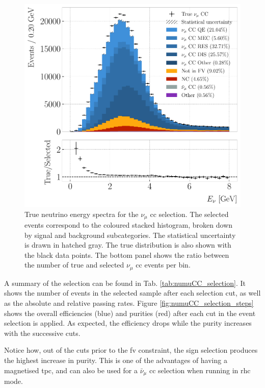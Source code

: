 \begin{figure}[t]
	\centering
	\includegraphics[width=.80\linewidth]{Images/GAr_selection/numuCC_selection_true_energy.pdf}
	\caption[True neutrino energy spectra for the $\nu_{\mu}$ \gls{cc} selection.]{True neutrino energy spectra for the $\nu_{\mu}$ \gls{cc} selection. The selected events correspond to the coloured stacked histogram, broken down by signal and background subcategories. The statistical uncertainty is drawn in hatched gray. The true distribution is also shown with the black data points. The bottom panel shows the ratio between the number of true and selected $\nu_{\mu}$ \gls{cc} events per bin.}
	\label{fig:numuCC_selection_true_enu}
\end{figure}

A summary of the selection can be found in Tab. \ref{tab:numuCC_selection}. It shows the number of events in the selected sample after each selection cut, as well as the absolute and relative passing rates. Figure \ref{fig:numuCC_selection_steps} shows the overall efficiencies (blue) and purities (red) after each cut in the event selection is applied. As expected, the efficiency drops while the purity increases with the successive cuts.

Notice how, out of the cuts prior to the \gls{fv} constraint, the sign selection produces the highest increase in purity. This is one of the advantages of having a magnetised \gls{tpc}, and can also be used for a $\bar{\nu}_{\mu}$ \gls{cc} selection when running in \gls{rhc} mode.

